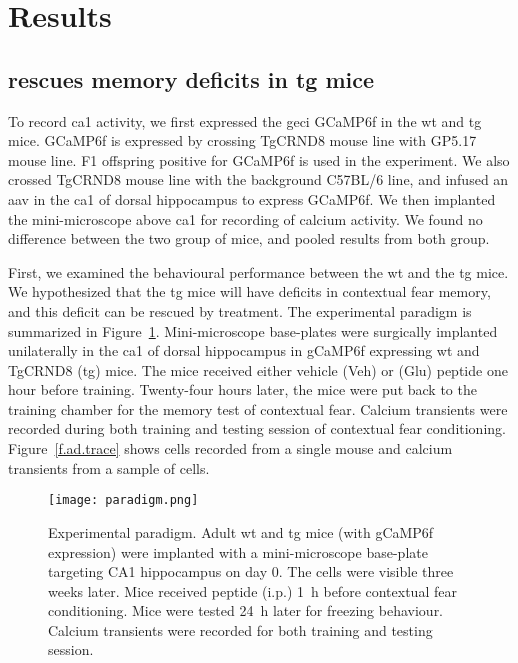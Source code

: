 \section{Results}


\subsection{\tglu{} rescues memory deficits in \gls{tg} mice}

To record \gls{ca1} activity, we first expressed the \gls{geci} GCaMP6f in the \gls{wt} and \gls{tg} mice. GCaMP6f is expressed by crossing TgCRND8 mouse line with GP5.17 mouse line. F1 offspring positive for GCaMP6f is used in the experiment. We also crossed TgCRND8 mouse line with the background C57BL/6 line, and infused an \gls{aav} in the \gls{ca1} of dorsal hippocampus to express GCaMP6f. We then implanted the mini-microscope above \gls{ca1} for recording of calcium activity. We found no difference between the two group of mice, and pooled results from both group. 

First, we examined the behavioural performance between the \gls{wt} and the \gls{tg} mice. We hypothesized that the \gls{tg} mice will have deficits in contextual fear memory, and this deficit can be rescued by \tglu{} treatment.  The experimental paradigm is summarized in Figure~\ref{f.ad.paradigm}. Mini-microscope base-plates were surgically implanted unilaterally in the \gls{ca1} of dorsal hippocampus in gCaMP6f expressing \gls{wt} and TgCRND8 (\gls{tg}) mice. The mice received either vehicle (Veh) or \tglu{} (Glu) peptide one hour before training. Twenty-four hours later, the mice were put back to the training chamber for the memory test of contextual fear. Calcium transients were recorded during both training and testing session of contextual fear conditioning. Figure~\ref{f.ad.trace} shows cells recorded from a single mouse and calcium transients from a sample of cells.
\begin{figure}[h]
    \texttt{[image: paradigm.png]}
    \caption[Experimental paradigm for contextual fear conditioning.]{Experimental paradigm. Adult \gls{wt} and \gls{tg} mice (with gCaMP6f expression) were implanted with a mini-microscope base-plate targeting CA1 hippocampus on day 0. The cells were visible three weeks later. Mice received \tglu{} peptide (i.p.) \SI{1}{\hour} before contextual fear conditioning. Mice were tested \SI{24}{\hour} later for freezing behaviour. Calcium transients were recorded for both training and testing session. \label{f.ad.paradigm}}
\end{figure}

